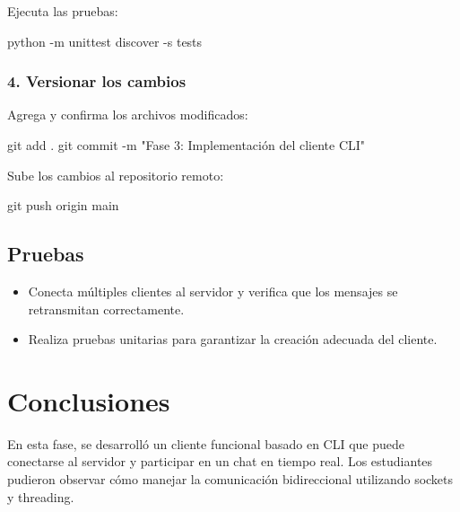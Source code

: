 \documentclass[
  a4paper,
  DIV=11,
  numbers=noendperiod,
  onepage,
  openany]{scrreprt}
\newenvironment{Shaded}{\begin{snugshade}}{\end{snugshade}}
\newcommand{\AttributeTok}[1]{\textcolor[rgb]{0.40,0.45,0.13}{#1}}
\newcommand{\ExtensionTok}[1]{\textcolor[rgb]{0.00,0.23,0.31}{#1}}
\newcommand{\FunctionTok}[1]{\textcolor[rgb]{0.28,0.35,0.67}{#1}}
\newcommand{\NormalTok}[1]{\textcolor[rgb]{0.00,0.23,0.31}{#1}}
\newcommand{\StringTok}[1]{\textcolor[rgb]{0.13,0.47,0.30}{#1}}
\providecommand{\tightlist}{%
  \setlength{\itemsep}{0pt}\setlength{\parskip}{0pt}}\usepackage{longtable,booktabs,array}
\begin{document}
Ejecuta las pruebas:

\begin{Shaded}
\begin{Highlighting}[]
\ExtensionTok{python} \AttributeTok{{-}m}\NormalTok{ unittest discover }\AttributeTok{{-}s}\NormalTok{ tests}
\end{Highlighting}
\end{Shaded}

\subsection{4. Versionar los cambios}\label{versionar-los-cambios-1}

Agrega y confirma los archivos modificados:

\begin{Shaded}
\begin{Highlighting}[]
\FunctionTok{git}\NormalTok{ add .}
\FunctionTok{git}\NormalTok{ commit }\AttributeTok{{-}m} \StringTok{"Fase 3: Implementación del cliente CLI"}
\end{Highlighting}
\end{Shaded}

Sube los cambios al repositorio remoto:

\begin{Shaded}
\begin{Highlighting}[]
\FunctionTok{git}\NormalTok{ push origin main}
\end{Highlighting}
\end{Shaded}

\section{Pruebas}\label{pruebas-2}

\begin{itemize}
\tightlist
\item
  Conecta múltiples clientes al servidor y verifica que los mensajes se
  retransmitan correctamente.
\item
  Realiza pruebas unitarias para garantizar la creación adecuada del
  cliente.
\end{itemize}

\chapter{Conclusiones}\label{conclusiones-16}

En esta fase, se desarrolló un cliente funcional basado en CLI que puede
conectarse al servidor y participar en un chat en tiempo real. Los
estudiantes pudieron observar cómo manejar la comunicación bidireccional
utilizando sockets y threading.
\end{document}
